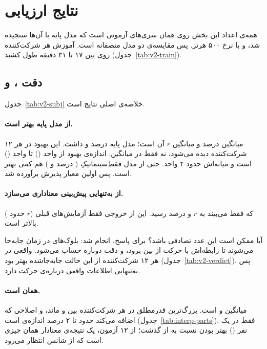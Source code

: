 \FloatBarrier
\section{نتایج ارزیابی }
\label{sec:v2-results}

همه‌ی اعداد این بخش روی همان سری‌های آزمونی است که مدل پایه با آن‌ها سنجیده شد، و با نرخ ۵۰۰ هرتز. پس مقایسه‌ی دو مدل منصفانه است. آموزش هر شرکت‌کننده روی  بین ۱۷ تا ۳۱ دقیقه طول کشید (جدول~\ref{tab:v2-train}).

\subsection{دقت ،  و }

جدول~\ref{tab:v2-subj} خلاصه‌ی اصلی نتایج است.

\paragraph{ از مدل پایه بهتر است.} میانگین    درصد و میانگین $r$ آن  است؛ مدل پایه  درصد و  داشت. این بهبود در هر ۱۲ شرکت‌کننده دیده می‌شود، نه فقط در میانگین. اندازه‌ی بهبود از  واحد () تا  واحد () است و میانه‌اش حدود ۴ واحد.  حتی از مدل فقط‌سینماتیکِ  ( درصد و ) هم کمی بهتر است. پس اولین معیار پذیرش  برآورده شد.



\paragraph{ از  به‌تنهایی پیش‌بینی معناداری می‌سازد.}  که فقط  می‌بیند به $r$  و   درصد رسید. این از خروجی فقط‌ آزمایش‌های قبلی ($r$ حدود ) بالاتر است.

آیا ممکن است این عدد تصادفی باشد؟ برای پاسخ،  انجام شد: بلوک‌های  در زمان جابه‌جا می‌شوند تا رابطه‌اش با حرکت از بین برود، و دقت دوباره حساب می‌شود.  واقعی در هر ۱۲ شرکت‌کننده از این حالت جابه‌جاشده بهتر بود (جدول~\ref{tab:v2-verdict}). پس  به‌تنهایی اطلاعات واقعی درباره‌ی حرکت دارد.

\paragraph{ همان  است.} میانگین    و   است. بزرگ‌ترین قدرمطلق  در هر شرکت‌کننده بین  و  ماند، و اصلاحی که  اضافه می‌کند حدود  تا ۲ درصد اندازه‌ی  است (جدول~\ref{tab:interp-parts}). فقط در یک نفر () بهتر بودن  نسبت به  از  گذشت؛ از ۱۲ آزمون، یک نتیجه‌ی معنادار همان چیزی است که از شانس انتظار می‌رود.

